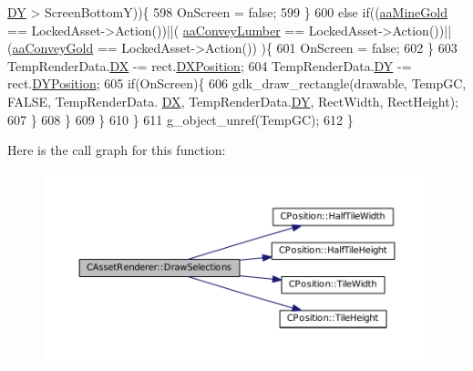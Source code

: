 \begin{DoxyCode}
      \hyperlink{structSAssetRenderData_af27e8a46e21a0935983bfc0d34d9ceba}{DY} > ScreenBottomY))\{
598                     OnScreen = \textcolor{keyword}{false};
599                 \}
600                 \textcolor{keywordflow}{else} \textcolor{keywordflow}{if}((\hyperlink{GameDataTypes_8h_ab47668e651a3032cfb9c40ea2d60d670abc45b1c4fbca1481e373a780a69bd56b}{aaMineGold} == LockedAsset->Action())||(
      \hyperlink{GameDataTypes_8h_ab47668e651a3032cfb9c40ea2d60d670a7b0954302f27f46b3fdf6fddd530d154}{aaConveyLumber} == LockedAsset->Action())||(\hyperlink{GameDataTypes_8h_ab47668e651a3032cfb9c40ea2d60d670ae80ac4dde60023e0a1794e994db7000a}{aaConveyGold} == LockedAsset->Action())
      )\{
601                     OnScreen = \textcolor{keyword}{false};
602                 \}
603                 TempRenderData.\hyperlink{structSAssetRenderData_ab432edfd1146e38a92576b78e2ad5581}{DX} -= rect.\hyperlink{structSRectangle_abcbddb03b3ee416cc33109833b5f075c}{DXPosition};
604                 TempRenderData.\hyperlink{structSAssetRenderData_af27e8a46e21a0935983bfc0d34d9ceba}{DY} -= rect.\hyperlink{structSRectangle_a120aa0a90033bc6e07c36c151a3bbc71}{DYPosition};
605                 \textcolor{keywordflow}{if}(OnScreen)\{
606                     gdk\_draw\_rectangle(drawable, TempGC, FALSE, TempRenderData.
      \hyperlink{structSAssetRenderData_ab432edfd1146e38a92576b78e2ad5581}{DX}, TempRenderData.\hyperlink{structSAssetRenderData_af27e8a46e21a0935983bfc0d34d9ceba}{DY}, RectWidth, RectHeight);
607                 \}
608             \}
609         \}
610     \}
611     g\_object\_unref(TempGC);
612 \}
\end{DoxyCode}
Here is the call graph for this function\+:
\nopagebreak
\begin{figure}[H]
\begin{center}
\leavevmode
\includegraphics[width=350pt]{classCAssetRenderer_ad9e2ab45919abbec23871b85a95ba8cf_cgraph}
\end{center}
\end{figure}
\hypertarget{classCAssetRenderer_a06e45891dcbc0a88570c537a4d6906c8}{}\label{classCAssetRenderer_a06e45891dcbc0a88570c537a4d6906c8} 
